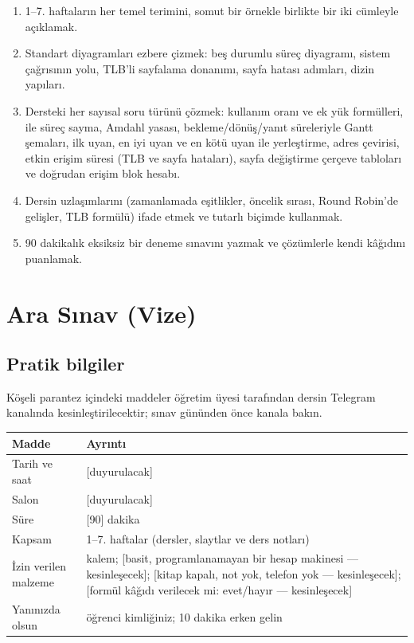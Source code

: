 \vspace{0.8em}
\begin{keyidea}
\begin{enumerate}[leftmargin=1.4em]
  \item 1--7. haftaların her temel terimini, somut bir örnekle birlikte bir iki cümleyle açıklamak.
  \item Standart diyagramları ezbere çizmek: beş durumlu süreç diyagramı, sistem çağrısının yolu, TLB'li sayfalama donanımı, sayfa hatası adımları, dizin yapıları.
  \item Dersteki her sayısal soru türünü çözmek: kullanım oranı ve ek yük formülleri,  ile süreç sayma, Amdahl yasası, bekleme/dönüş/yanıt süreleriyle Gantt şemaları, ilk uyan, en iyi uyan ve en kötü uyan ile yerleştirme, adres çevirisi, etkin erişim süresi (TLB ve sayfa hataları), sayfa değiştirme çerçeve tabloları ve doğrudan erişim blok hesabı.
  \item Dersin uzlaşımlarını (zamanlamada eşitlikler, öncelik sırası, Round Robin'de gelişler, TLB formülü) ifade etmek ve tutarlı biçimde kullanmak.
  \item 90 dakikalık eksiksiz bir deneme sınavını yazmak ve çözümlerle kendi kâğıdını puanlamak.
\end{enumerate}
\end{keyidea}

\setcounter{tocdepth}{1}
\tableofcontents

\section{Ara Sınav (Vize)}
\label{sec:exam}
\subsection{Pratik bilgiler}
Köşeli parantez içindeki maddeler öğretim üyesi tarafından dersin Telegram kanalında kesinleştirilecektir; sınav gününden önce kanala bakın.
\begin{center}
\renewcommand{\arraystretch}{1.3}
\begin{tabularx}{\linewidth}{>{\raggedright\arraybackslash}p{4.0cm} X}
\toprule
\textbf{Madde} & \textbf{Ayrıntı} \\
\midrule
Tarih ve saat & [duyurulacak] \\
Salon & [duyurulacak] \\
Süre & [90] dakika \\
Kapsam & 1--7. haftalar (dersler, slaytlar ve ders notları) \\
İzin verilen malzeme & kalem; [basit, programlanamayan bir hesap makinesi --- kesinleşecek]; [kitap kapalı, not yok, telefon yok --- kesinleşecek]; [formül kâğıdı verilecek mi: evet/hayır --- kesinleşecek] \\
Yanınızda olsun & öğrenci kimliğiniz; 10 dakika erken gelin \\
\bottomrule
\end{tabularx}
\end{center}

